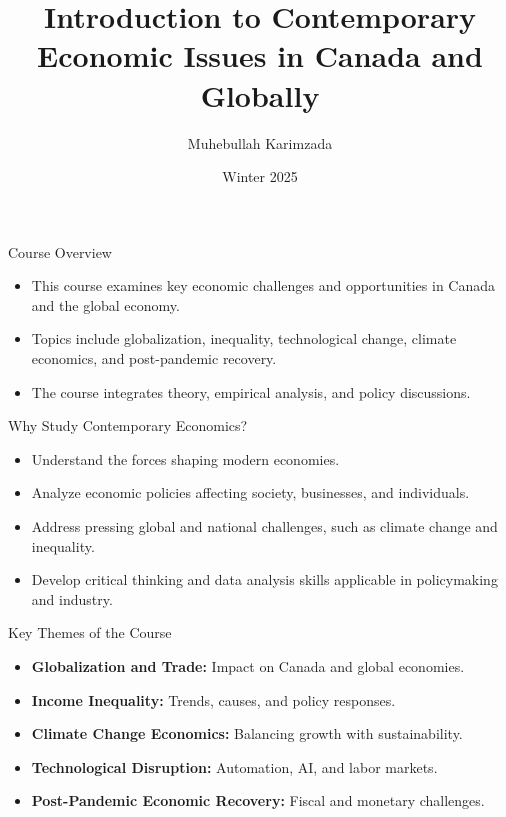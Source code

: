 \documentclass{beamer}
\title{Introduction to Contemporary Economic Issues in Canada and Globally}
\author{Muhebullah Karimzada}
\date{Winter 2025}
\begin{document}
\begin{frame}
  \titlepage
\end{frame}

\begin{frame}{Course Overview}
  \begin{itemize}
    \item This course examines key economic challenges and opportunities in Canada and the global economy.
    \item Topics include globalization, inequality, technological change, climate economics, and post-pandemic recovery.
    \item The course integrates theory, empirical analysis, and policy discussions.
  \end{itemize}
\end{frame}


\begin{frame}{Why Study Contemporary Economics?}
  \begin{itemize}
    \item Understand the forces shaping modern economies.
    \item Analyze economic policies affecting society, businesses, and individuals.
    \item Address pressing global and national challenges, such as climate change and inequality.
    \item Develop critical thinking and data analysis skills applicable in policymaking and industry.
  \end{itemize}
\end{frame}


\begin{frame}{Key Themes of the Course}
  \begin{itemize}
    \item \textbf{Globalization and Trade:} Impact on Canada and global economies.
    \item \textbf{Income Inequality:} Trends, causes, and policy responses.
    \item \textbf{Climate Change Economics:} Balancing growth with sustainability.
    \item \textbf{Technological Disruption:} Automation, AI, and labor markets.
    \item \textbf{Post-Pandemic Economic Recovery:} Fiscal and monetary challenges.
  \end{itemize}
\end{frame}
\end{document}
